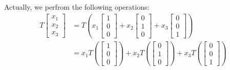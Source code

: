     Actually, we perfrom the following operations:
                \begin{equation}
                    \begin{aligned}
                    T \begin{bmatrix}
                            x_1\\
                            x_2\\
                            x_3
                    \end{bmatrix}
                    &= 
                    T(
                    x_1\begin{bmatrix}
                            1\\
                            0\\
                            0
                    \end{bmatrix}
                    +
                    x_2\begin{bmatrix}
                            0\\
                            1\\
                            0
                    \end{bmatrix}
                    +
                    x_3\begin{bmatrix}
                            0\\
                            0\\
                            1
                    \end{bmatrix}
                    )\\
                    &=
                    x_1T(\begin{bmatrix}
                            1\\
                            0\\
                            0
                    \end{bmatrix})
                    +
                    x_2T(\begin{bmatrix}
                            0\\
                            1\\
                            0
                    \end{bmatrix})
                    +
                    x_3T(\begin{bmatrix}
                            0\\
                            0\\
                            1
                    \end{bmatrix}
                    )             
                    \end{aligned}
                \end{equation}
